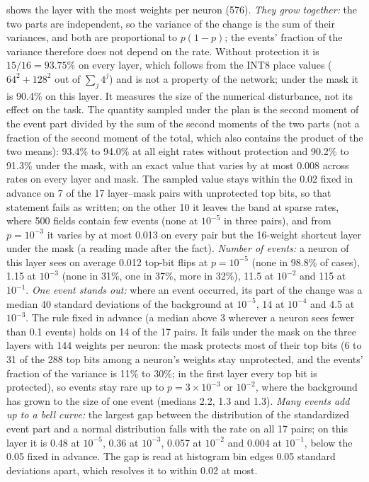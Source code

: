  shows the layer with the most weights per neuron (576). \emph{They grow together:} the two parts are independent, so the variance of the change is the sum of their variances, and both are proportional to $p(1-p)$; the events' fraction of the variance therefore does not depend on the rate. Without protection it is $15/16=93.75\%$ on every layer, which follows from the INT8 place values ($64^2+128^2$ out of $\sum_j 4^j$) and is not a property of the network; under the mask it is 90.4\% on this layer. It measures the size of the numerical disturbance, not its effect on the task. The quantity sampled under the plan is the second moment of the event part divided by the sum of the second moments of the two parts (not a fraction of the second moment of the total, which also contains the product of the two means): 93.4\% to 94.0\% at all eight rates without protection and 90.2\% to 91.3\% under the mask, with an exact value that varies by at most 0.008 across rates on every layer and mask. The sampled value stays within the 0.02 fixed in advance on 7 of the 17 layer--mask pairs with unprotected top bits, so that statement fails as written; on the other 10 it leaves the band at sparse rates, where 500 fields contain few events (none at $10^{-5}$ in three pairs), and from $p=10^{-3}$ it varies by at most 0.013 on every pair but the 16-weight shortcut layer under the mask (a reading made after the fact). \emph{Number of events:} a neuron of this layer sees on average 0.012 top-bit flips at $p=10^{-5}$ (none in 98.8\% of cases), 1.15 at $10^{-3}$ (none in 31\%, one in 37\%, more in 32\%), 11.5 at $10^{-2}$ and 115 at $10^{-1}$. \emph{One event stands out:} where an event occurred, its part of the change was a median 40 standard deviations of the background at $10^{-5}$, 14 at $10^{-4}$ and 4.5 at $10^{-3}$. The rule fixed in advance (a median above 3 wherever a neuron sees fewer than 0.1 events) holds on 14 of the 17 pairs. It fails under the mask on the three layers with 144 weights per neuron: the mask protects most of their top bits (6 to 31 of the 288 top bits among a neuron's weights stay unprotected, and the events' fraction of the variance is 11\% to 30\%; in the first layer every top bit is protected), so events stay rare up to $p=3\times10^{-3}$ or $10^{-2}$, where the background has grown to the size of one event (medians 2.2, 1.3 and 1.3). \emph{Many events add up to a bell curve:} the largest gap between the distribution of the standardized event part and a normal distribution falls with the rate on all 17 pairs; on this layer it is 0.48 at $10^{-5}$, 0.36 at $10^{-3}$, 0.057 at $10^{-2}$ and 0.004 at $10^{-1}$, below the 0.05 fixed in advance. The gap is read at histogram bin edges 0.05 standard deviations apart, which resolves it to within 0.02 at most.

